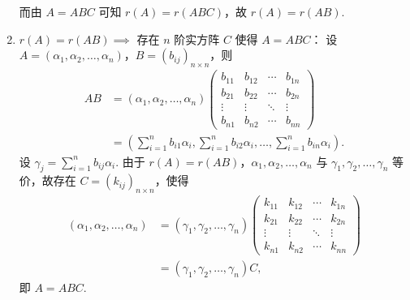 \begin{exercise}
\begin{exgroup}
\begin{answer}
\begin{enumerate}
                    而由 $A=ABC$ 可知 $r(A) = r(ABC)$，故 $r(A) = r(AB)$.

                \item $r(A) = r(AB) \implies$ 存在 $n$ 阶实方阵 $C$ 使得 $A = ABC$：
                    设 $A = (\alpha_1, \alpha_2, \ldots, \alpha_n)$，$B = (b_{ij})_{n \times n}$，则
                    \begin{align*}
                        AB &= (\alpha_1, \alpha_2, \ldots, \alpha_n) \begin{pmatrix}
                                  b_{11} & b_{12} & \cdots & b_{1n} \\
                                  b_{21} & b_{22} & \cdots & b_{2n} \\
                                  \vdots & \vdots & \ddots & \vdots \\
                                  b_{n1} & b_{n2} & \cdots & b_{nn}
                              \end{pmatrix} \\
                           &= \left( \sum_{i=1}^n b_{i1} \alpha_i, \sum_{i=1}^n b_{i2} \alpha_i, \ldots, \sum_{i=1}^n b_{in} \alpha_i \right).
                    \end{align*}
                    设 $\gamma_j = \sum_{i=1}^n b_{ij} \alpha_i$. 由于 $r(A) = r(AB)$，$\alpha_1, \alpha_2, \ldots, \alpha_n$ 与 $\gamma_1, \gamma_2, \ldots, \gamma_n$ 等价，故存在 $C = (k_{ij})_{n \times n}$，使得
                    \begin{align*}
                        (\alpha_1, \alpha_2, \ldots, \alpha_n)
                        &= (\gamma_1, \gamma_2, \ldots, \gamma_n) \begin{pmatrix}
                            k_{11} & k_{12} & \cdots & k_{1n} \\
                            k_{21} & k_{22} & \cdots & k_{2n} \\
                            \vdots & \vdots & \ddots & \vdots \\
                            k_{n1} & k_{n2} & \cdots & k_{nn}
                        \end{pmatrix} \\
                        &= (\gamma_1, \gamma_2, \ldots, \gamma_n) C,
                    \end{align*}
                    即 $A = ABC$.
            \end{enumerate}
        \end{answer}


\end{exgroup}
\end{exercise}
